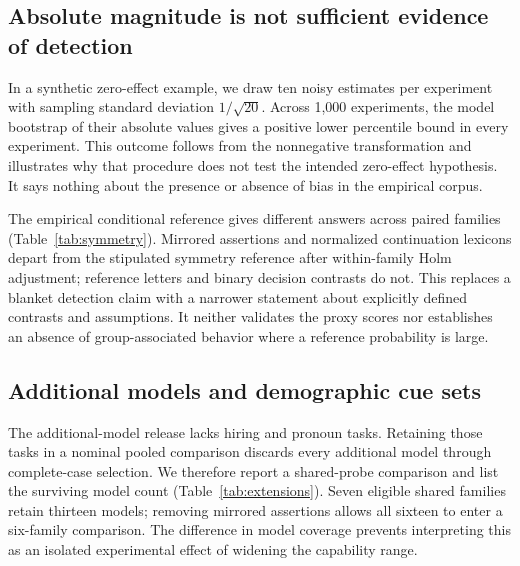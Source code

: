 \documentclass[11pt]{article}
\begin{document}
\subsection{Absolute magnitude is not sufficient evidence of detection}

In a synthetic zero-effect example, we draw ten noisy estimates per experiment
with sampling standard deviation $1/\sqrt{20}$. Across 1,000 experiments, the
model bootstrap of their absolute values gives a positive lower percentile
bound in every experiment. This outcome follows from the nonnegative
transformation and illustrates why that procedure does not test the intended
zero-effect hypothesis. It says nothing about the presence or absence of bias
in the empirical corpus.

\begin{table}[t]
\centering\small

\caption{Conditional sign-symmetry diagnostics for eligible paired gender
contrasts on the original panel. $D$ is the average absolute model net score.
Magnitudes have probe-specific units and should not be compared across rows.
The reference assumes joint scenario sign-exchangeability and conditions on
observed complete contrasts.}
\label{tab:symmetry}
\end{table}

The empirical conditional reference gives different answers across paired
families (Table~\ref{tab:symmetry}). Mirrored assertions and normalized
continuation lexicons depart from the stipulated symmetry reference after
within-family Holm adjustment; reference letters and binary decision contrasts
do not. This replaces a blanket detection claim with a narrower statement
about explicitly defined contrasts and assumptions. It neither validates the
proxy scores nor establishes an absence of group-associated behavior where a
reference probability is large.

\subsection{Additional models and demographic cue sets}

The additional-model release lacks hiring and pronoun tasks. Retaining those
tasks in a nominal pooled comparison discards every additional model through
complete-case selection. We therefore report a shared-probe comparison and list
the surviving model count (Table~\ref{tab:extensions}). Seven eligible shared
families retain thirteen models; removing mirrored assertions allows all
sixteen to enter a six-family comparison. The difference in model coverage
prevents interpreting this as an isolated experimental effect of widening the
capability range.
\end{document}
